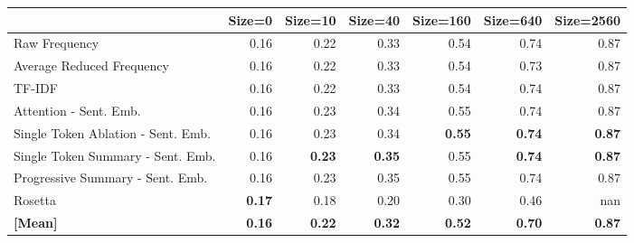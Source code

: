 \begin{tabular}{lrrrrrr}
\toprule
 & Size=0 & Size=10 & Size=40 & Size=160 & Size=640 & Size=2560 \\
\midrule
Raw Frequency & \cellcolor[RGB]{58,76,192}0.16 & \cellcolor[RGB]{82,110,220}0.22 & \cellcolor[RGB]{134,169,252}0.33 & \cellcolor[RGB]{229,216,208}0.54 & \cellcolor[RGB]{236,128,100}0.74 & \cellcolor[RGB]{179,3,38}0.87 \\
Average Reduced Frequency & \cellcolor[RGB]{58,76,192}0.16 & \cellcolor[RGB]{82,110,220}0.22 & \cellcolor[RGB]{134,169,252}0.33 & \cellcolor[RGB]{229,216,208}0.54 & \cellcolor[RGB]{236,130,102}0.73 & \cellcolor[RGB]{179,3,38}0.87 \\
TF-IDF & \cellcolor[RGB]{58,76,192}0.16 & \cellcolor[RGB]{82,110,220}0.22 & \cellcolor[RGB]{137,172,252}0.33 & \cellcolor[RGB]{229,216,208}0.54 & \cellcolor[RGB]{235,127,99}0.74 & \cellcolor[RGB]{179,3,38}0.87 \\
Attention - Sent. Emb. & \cellcolor[RGB]{58,76,192}0.16 & \cellcolor[RGB]{86,115,224}0.23 & \cellcolor[RGB]{141,175,253}0.34 & \cellcolor[RGB]{231,214,205}0.55 & \cellcolor[RGB]{236,128,100}0.74 & \cellcolor[RGB]{179,3,38}0.87 \\
Single Token Ablation - Sent. Emb. & \cellcolor[RGB]{58,76,192}0.16 & \cellcolor[RGB]{87,117,225}0.23 & \cellcolor[RGB]{141,175,253}0.34 & \cellcolor[RGB]{233,212,201}\textbf{0.55} & \cellcolor[RGB]{234,125,97}\textbf{0.74} & \cellcolor[RGB]{179,3,38}\textbf{0.87} \\
Single Token Summary - Sent. Emb. & \cellcolor[RGB]{58,76,192}0.16 & \cellcolor[RGB]{90,120,227}\textbf{0.23} & \cellcolor[RGB]{145,179,254}\textbf{0.35} & \cellcolor[RGB]{232,213,202}0.55 & \cellcolor[RGB]{234,125,97}\textbf{0.74} & \cellcolor[RGB]{179,3,38}\textbf{0.87} \\
Progressive Summary - Sent. Emb. & \cellcolor[RGB]{58,76,192}0.16 & \cellcolor[RGB]{87,117,225}0.23 & \cellcolor[RGB]{144,178,254}0.35 & \cellcolor[RGB]{232,213,202}0.55 & \cellcolor[RGB]{235,127,99}0.74 & \cellcolor[RGB]{181,8,39}0.87 \\
Rosetta & \cellcolor[RGB]{59,77,193}\textbf{0.17} & \cellcolor[RGB]{65,86,201}0.18 & \cellcolor[RGB]{73,98,211}0.20 & \cellcolor[RGB]{123,158,248}0.30 & \cellcolor[RGB]{197,213,242}0.46 & \cellcolor[RGB]{0,0,0}nan \\
\midrule 
\textbf{[Mean]} & \textbf{0.16} & \textbf{0.22} & \textbf{0.32} & \textbf{0.52} & \textbf{0.70} & \textbf{0.87} \\
\bottomrule
\end{tabular}